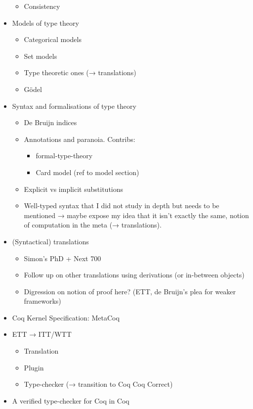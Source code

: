 \begin{itemize}
\begin{itemize}
      \item Consistency
    \end{itemize}
  \item Models of type theory
    \begin{itemize}
      \item Categorical models
      \item Set models
      \item Type theoretic ones (→ translations)
      \item Gödel
    \end{itemize}
  \item Syntax and formalisations of type theory
    \begin{itemize}
      \item De Bruijn indices
      \item Annotations and paranoia. Contribs:
        \begin{itemize}
          \item formal-type-theory
          \item Card model (ref to model section)
        \end{itemize}
      \item Explicit vs implicit substitutions
      \item Well-typed syntax that I did not study in depth but needs to be
      mentioned → maybe expose my idea that it isn't exactly the same,
      notion of computation in the meta (→ translations).
    \end{itemize}
  \item (Syntactical) translations
    \begin{itemize}
      \item Simon's PhD + Next 700
      \item Follow up on other translations using derivations (or in-between
      objects)
      \item Digression on notion of proof here? (ETT, de Bruijn's plea for
      weaker frameworks)
    \end{itemize}
  \item Coq Kernel Specification: MetaCoq
  \item ETT → ITT/WTT
    \begin{itemize}
      \item Translation
      \item Plugin
      \item Type-checker (→ transition to Coq Coq Correct)
    \end{itemize}
  \item A verified type-checker for Coq in Coq
\end{itemize}